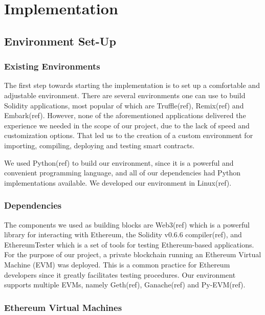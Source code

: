 \section{Implementation}

\subsection{Environment Set-Up}

\subsubsection{Existing Environments}

The first step towards starting the implementation is to set up a
comfortable and adjustable environment. There are several environments
one can use to build Solidity applications, most popular of which are
Truffle(ref), Remix(ref) and Embark(ref). However, none of the
aforementioned applications delivered the experience we needed in the
scope of our project, due to the lack of speed and customization
options. That led us to the creation of a custom environment for
importing, compiling, deploying and testing smart contracts.

We used Python(ref) to build our environment, since it is a powerful
and convenient programming language, and all of our dependencies had
Python implementations available. We developed our environment in
Linux(ref).

\subsubsection{Dependencies}

The components we used as building blocks are Web3(ref) which is a
powerful library for interacting with Ethereum, the Solidity v0.6.6
compiler(ref), and EthereumTester which is a set of tools for testing
Ethereum-based applications. For the purpose of our project, a private
blockchain running an Ethereum Virtual Machine (EVM) was deployed.
This is a common practice for Ethereum developers since it greatly
facilitates testing procedures. Our environment supports multiple
EVMs, namely Geth(ref), Ganache(ref) and Py-EVM(ref).

\subsubsection{Ethereum Virtual Machines}


